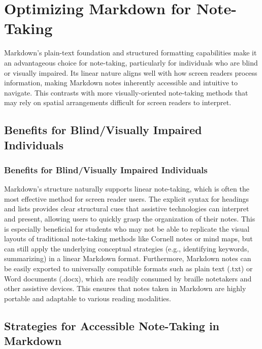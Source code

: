 \section{Optimizing Markdown for Note-Taking}
\label{sec:markdown-note-taking}

Markdown's plain-text foundation and structured formatting capabilities make it an advantageous choice for note-taking, particularly for individuals who are blind or visually impaired. Its linear nature aligns well with how screen readers process information, making Markdown notes inherently accessible and intuitive to navigate. \cite{PerkinsNoteTaking, TeachingVI} This contrasts with more visually-oriented note-taking methods that may rely on spatial arrangements difficult for screen readers to interpret.

\subsection{Benefits for Blind/Visually Impaired Individuals}
\subsubsection{Benefits for Blind/Visually Impaired Individuals}

Markdown's structure naturally supports linear note-taking, which is often the most effective method for screen reader users. \cite{PerkinsNoteTaking} The explicit syntax for headings and lists provides clear structural cues that assistive technologies can interpret and present, allowing users to quickly grasp the organization of their notes. \cite{TeachingVI, MarkdownToolbox} This is especially beneficial for students who may not be able to replicate the visual layouts of traditional note-taking methods like Cornell notes or mind maps, but can still apply the underlying conceptual strategies (e.g., identifying keywords, summarizing) in a linear Markdown format. \cite{PerkinsNoteTaking} Furthermore, Markdown notes can be easily exported to universally compatible formats such as plain text (.txt) or Word documents (.docx), which are readily consumed by braille notetakers and other assistive devices. \cite{TeachingVI} This ensures that notes taken in Markdown are highly portable and adaptable to various reading modalities.

\subsection{Strategies for Accessible Note-Taking in Markdown}

